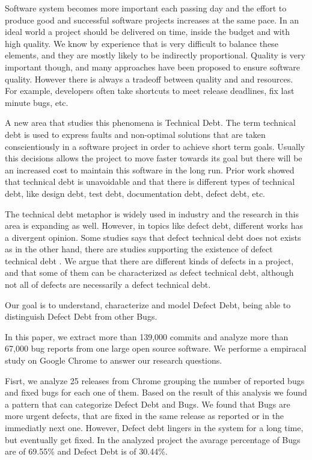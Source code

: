 Software system becomes more important each passing day and the effort to produce good and successful software projects increases at the same pace. In an ideal world a project  should be delivered on time, inside the budget and with high quality. We know by experience that is very  difficult to balance these elements, and they are mostly likely to be indirectly proportional. Quality is very important though, and many approaches have been proposed to ensure software quality. However there is always a tradeoff between quality and and resources. For example, developers often take shortcuts to meet release deadlines, fix last minute bugs, etc.

A new area that studies this phenomena is Technical Debt. The term technical debt is used to express faults and non-optimal solutions that are taken conscientiously in a software project in order to achieve short term goals. Usually  this decisions allows the project to move faster towards its goal but there will be an increased cost to maintain this software in the long run. Prior work \cite{Lim2012Software} showed that technical debt is unavoidable and that there is different types of technical debt, like design debt, test debt, documentation debt, defect debt, etc.  

The technical debt metaphor is widely used in industry and the research in this area is expanding as well. However, in topics like defect debt, different works has a divergent opinion. Some studies says that defect technical debt does not exists \cite{Kruchten2013GSOFT} as in the other hand, there are studies supporting the existence of defect technical debt \cite{Seaman201125}. We argue that there are different kinds of defects in a project, and that some of them can be characterized as defect technical debt, although not all of defects are necessarily  a defect technical debt. 

Our goal is to understand, characterize and model Defect Debt, being able to distinguish Defect Debt from other Bugs.

In this paper, we extract more than 139,000 commits and analyze more than 67,000 bug reports from one large open source software. We performe a empiracal study on Google Chrome to answer our research questions. 

Fisrt, we analyze 25 releases from Chrome grouping the number of reported bugs and fixed bugs for each one of them. Based on the result of this analysis we found a pattern that can categorize Defect Debt and Bugs. We found that Bugs are more urgent defects, that are fixed in the same release as reported or in the immediatly next one. However, Defect debt lingers in the system for a long time, but eventually get fixed. In the analyzed project the avarage percentage of Bugs are of 69.55\% and Defect Debt is of 30.44\%.

